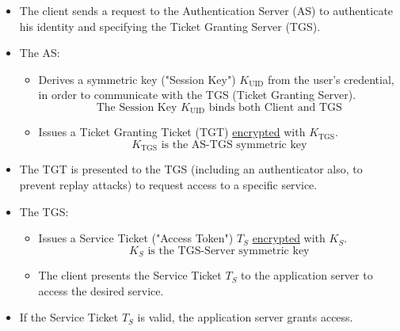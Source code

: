 \begin{itemize}
    \item The client sends a request to the Authentication Server (AS) to authenticate his identity and specifying the Ticket Granting Server (TGS).
    \item The AS:
    \begin{itemize}
        \item Derives a symmetric key ("Session Key") $K_{\text{UID}}$ from the user's credential, in order to communicate with the TGS (Ticket Granting Server).
        \[\text{The Session Key } K_{\text{UID}} \text{ binds both Client and TGS}\]
        \item Issues a Ticket Granting Ticket (TGT) \underline{encrypted} with $K_{\text{TGS}}$.
        \[K_{\text{TGS}} \text{ is the AS-TGS symmetric key}\]
\end{itemize}
    \item The TGT is presented to the TGS (including an authenticator also, to prevent replay attacks) to request access to a specific service.
    \item The TGS:
    \begin{itemize}
        \item Issues a Service Ticket ("Access Token") $T_S$ \underline{encrypted} with $K_S$. 
        \[K_S \text{ is the TGS-Server symmetric key}\]
        \item The client presents the Service Ticket $T_S$ to the application server to access the desired service.
    \end{itemize} 
    \item If the Service Ticket $T_S$ is valid, the application server grants access.
\end{itemize}


